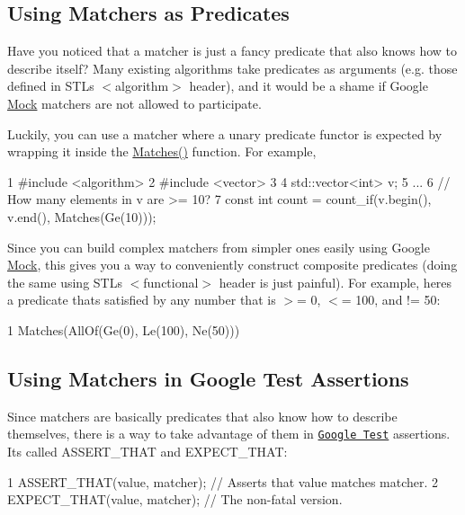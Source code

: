 \subsection*{Using Matchers as Predicates}

Have you noticed that a matcher is just a fancy predicate that also knows how to describe itself? Many existing algorithms take predicates as arguments (e.\+g. those defined in S\+TL\textquotesingle{}s {\ttfamily $<$algorithm$>$} header), and it would be a shame if Google \hyperlink{class_mock}{Mock} matchers are not allowed to participate.

Luckily, you can use a matcher where a unary predicate functor is expected by wrapping it inside the {\ttfamily \hyperlink{namespacetesting_ad53b509ae9cd51040d67f668f99702ae}{Matches()}} function. For example,


\begin{DoxyCode}
1 #include <algorithm>
2 #include <vector>
3 
4 std::vector<int> v;
5 ...
6 // How many elements in v are >= 10?
7 const int count = count\_if(v.begin(), v.end(), Matches(Ge(10)));
\end{DoxyCode}


Since you can build complex matchers from simpler ones easily using Google \hyperlink{class_mock}{Mock}, this gives you a way to conveniently construct composite predicates (doing the same using S\+TL\textquotesingle{}s {\ttfamily $<$functional$>$} header is just painful). For example, here\textquotesingle{}s a predicate that\textquotesingle{}s satisfied by any number that is $>$= 0, $<$= 100, and != 50\+:


\begin{DoxyCode}
1 Matches(AllOf(Ge(0), Le(100), Ne(50)))
\end{DoxyCode}


\subsection*{Using Matchers in Google Test Assertions}

Since matchers are basically predicates that also know how to describe themselves, there is a way to take advantage of them in \href{http://code.google.com/p/googletest/}{\tt Google Test} assertions. It\textquotesingle{}s called {\ttfamily A\+S\+S\+E\+R\+T\+\_\+\+T\+H\+AT} and {\ttfamily E\+X\+P\+E\+C\+T\+\_\+\+T\+H\+AT}\+:


\begin{DoxyCode}
1 ASSERT\_THAT(value, matcher);  // Asserts that value matches matcher.
2 EXPECT\_THAT(value, matcher);  // The non-fatal version.
\end{DoxyCode}



